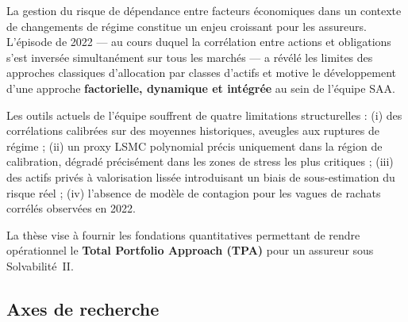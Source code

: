 \documentclass[10pt,a4paper]{article}
\begin{document}
La gestion du risque de dépendance entre facteurs économiques dans un contexte
de changements de régime constitue un enjeu croissant pour les assureurs.
L'épisode de 2022 --- au cours duquel la corrélation entre actions et
obligations s'est inversée simultanément sur tous les marchés --- a révélé les
limites des approches classiques d'allocation par classes d'actifs et motive le
développement d'une approche \textbf{factorielle, dynamique et intégrée} au
sein de l'équipe SAA.

Les outils actuels de l'équipe souffrent de quatre limitations structurelles :
(i) des corrélations calibrées sur des moyennes historiques, aveugles aux
ruptures de régime ; (ii) un proxy LSMC polynomial précis uniquement dans la
région de calibration, dégradé précisément dans les zones de stress les plus
critiques ; (iii) des actifs privés à valorisation lissée introduisant un biais
de sous-estimation du risque réel ; (iv) l'absence de modèle de contagion pour
les vagues de rachats corrélés observées en 2022.

La thèse vise à fournir les fondations quantitatives permettant de rendre
opérationnel le \textbf{Total Portfolio Approach (TPA)} pour un assureur sous
Solvabilité~II.

\subsection{Axes de recherche}
\end{document}
